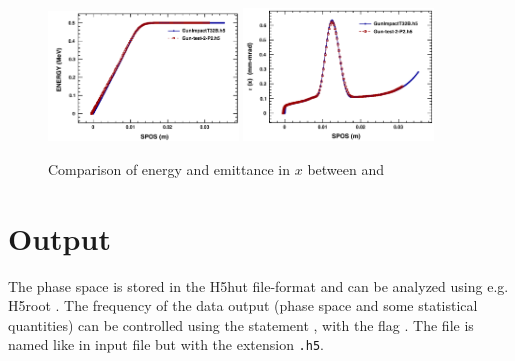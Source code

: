 \begin{figure}[!htb]
\centering
   \includegraphics[width=0.45\textwidth]{figures/Gun/GunCompEn}
   \hspace{0.05\textwidth}
   \includegraphics[width=0.45\textwidth]{figures/Gun/GunCompEx}
   \caption{Comparison of energy and emittance in $x$ between \impactt and \opalt}
   \label{fig:guncomp1}
\end{figure}



\section{Output}
The phase space is stored in the H5hut file-format \cite{bib:howison2010} and can be analyzed
using e.g. H5root \cite{bib:schietinger}. The frequency
of the data output (phase space and some statistical quantities) can be controlled using the  statement ,
 with the flag . The file is named like in input file but with the extension {\tt .h5}.

